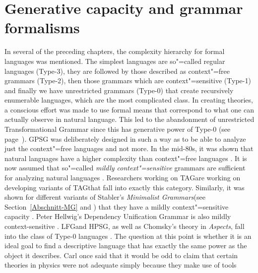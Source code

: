 
\chapter{Generative capacity and grammar formalisms}
\label{sec-generative-capacity}\label{chap-complexity}

In several of the preceding chapters,
the complexity hierarchy for formal languages was mentioned. The simplest languages are so"=called regular languages (Type-3),
they are followed by those described as context"=free grammars (Type-2), then those grammars which are 
context"=sensitive (Type-1) and finally we have unrestricted grammars (Type-0) that
create recursively enumerable languages, which are the most complicated class. In creating theories, a conscious effort was made to
use formal means that correspond to what one can actually observe in natural language.
This led to the abandonment of unrestricted Transformational Grammar since this has generative power of Type-0 (see page~\pageref{page-TG-Typ0}).
GPSG was deliberately designed in such a way as to be able to analyze just the context"=free
languages and not more. In the mid-80s, it was shown that natural languages have a higher complexity
than context"=free languages \citep{Shieber85a,Culy85a}. It is now assumed that so"=called
\emph{mildly context"=sensitive} grammars are sufficient for analyzing natural languages \citep{Joshi85a-u}. Researchers 
working on TAG\indextag are working on developing variants of TAG\indextag that fall into exactly
this category. Similarly, it was shown for different variants of Stabler's \emph{Minimalist
  Grammars}\indexmg (see Section~\ref{Abschnitt-MG} and \citealp{Stabler2001a,Stabler2010b}) that they
have a mildly context"=sensitive capacity \citep{Michaelis2001a-u}. Peter Hellwig's Dependency
Unification Grammar is also mildly context-sensitive
\citep[]{Hellwig2003a}. 
LFG\indexlfg and HPSG\indexhpsg, as well as Chomsky's theory in \emph{Aspects}, fall into the class of Type-0 languages \citep{Berwick82a-u,Johnson88}.
The question at this point is whether it is an ideal goal to find a descriptive language that has exactly the same power as the object it describes.
Carl \citet[]{Pollard97a} once said that it would be odd to claim that certain theories in physics were not adequate simply because they make use of tools
